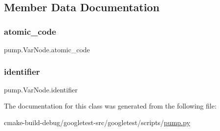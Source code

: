 \subsection{Member Data Documentation}
\mbox{\label{classpump_1_1VarNode_ad6bef6a8577b994fbe9ccddf3c82d2fc}} 
\subsubsection{\texorpdfstring{atomic\_code}{atomic\_code}}
{\footnotesize\ttfamily pump.\+Var\+Node.\+atomic\+\_\+code}

\mbox{\label{classpump_1_1VarNode_aa2b634e2443646c3754f2d193efa4dc7}} 
\subsubsection{\texorpdfstring{identifier}{identifier}}
{\footnotesize\ttfamily pump.\+Var\+Node.\+identifier}



The documentation for this class was generated from the following file\+:\begin{DoxyCompactItemize}
\item 
cmake-\/build-\/debug/googletest-\/src/googletest/scripts/\mbox{\hyperlink{pump_8py}{pump.\+py}}\end{DoxyCompactItemize}

